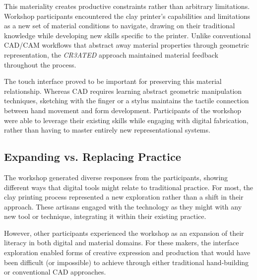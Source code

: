 \vspace{0.5cm}

This materiality creates productive constraints rather than arbitrary limitations. Workshop participants encountered the clay printer's capabilities and limitations as a new set of material conditions to navigate, drawing on their traditional knowledge while developing new skills specific to the printer. Unlike conventional CAD/CAM workflows that abstract away material properties through geometric representation, the \textit{CR3ATED} approach maintained material feedback throughout the process.

\vspace{0.5cm}

The touch interface proved to be important for preserving this material relationship. Whereas CAD requires learning abstract geometric manipulation techniques, sketching with the finger or a stylus maintains the tactile connection between hand movement and form development. Participants of the workshop were able to leverage their existing skills while engaging with digital fabrication, rather than having to master entirely new representational systems.

\subsection{Expanding vs. Replacing Practice}

The workshop generated diverse responses from the participants, showing different ways that digital tools might relate to traditional practice. For most, the clay printing process represented a new exploration rather than a shift in their approach. These artisans engaged with the technology as they might with any new tool or technique, integrating it within their existing practice.

\vspace{0.5cm}

However, other participants experienced the workshop as an expansion of their literacy in both digital and material domains. For these makers, the interface exploration enabled forms of creative expression and production that would have been difficult (or impossible) to achieve through either traditional hand-building or conventional CAD approaches.

\vspace{0.5cm}












